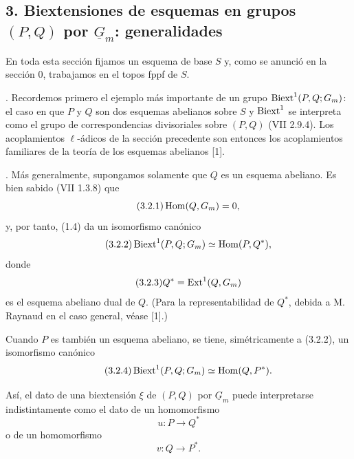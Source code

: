 
\subsection*{3. Biextensiones de esquemas en grupos $(P,Q)$ por
$\underline G_m$: generalidades}

En toda esta sección fijamos un esquema de base $S$ y, como se anunció
en la sección 0, trabajamos en el topos fppf de $S$.

\medskip
{}. Recordemos primero el ejemplo más importante de un
grupo $\operatorname{Biext}^1(P,Q;G_m)$: el caso en que $P$ y $Q$ son
dos esquemas abelianos sobre $S$ y $\operatorname{Biext}^1$ se interpreta como el
grupo de correspondencias divisoriales sobre $(P,Q)$ (VII 2.9.4). Los
acoplamientos $\ell$-ádicos de la sección precedente son entonces los
acoplamientos familiares de la teoría de los esquemas abelianos [1].

\medskip
{}. Más generalmente, supongamos solamente que $Q$ es un
esquema abeliano. Es bien sabido (VII 1.3.8) que
\begin{equation}\tag{3.2.1}
 \operatorname{Hom}(Q,G_m)=0,
\end{equation}
y, por tanto, (1.4) da un isomorfismo canónico
\begin{equation}\tag{3.2.2}
 \operatorname{Biext}^1(P,Q;G_m)\simeq\operatorname{Hom}(P,Q^*),
\end{equation}
donde
\begin{equation}\tag{3.2.3}
 Q^*=\operatorname{Ext}^1(Q,G_m)
\end{equation}
es el esquema abeliano dual de $Q$. (Para la representabilidad de
$Q^*$, debida a M. Raynaud en el caso general, véase [1].)

Cuando $P$ es también un esquema abeliano, se tiene, simétricamente a
(3.2.2), un isomorfismo canónico
\begin{equation}\tag{3.2.4}
 \operatorname{Biext}^1(P,Q;G_m)\simeq\operatorname{Hom}(Q,P^*).
\end{equation}


Así, el dato de una biextensión $\xi$ de $(P,Q)$ por $\underline G_m$
puede interpretarse indistintamente como el dato de un homomorfismo
\[
 u:P\longrightarrow Q^*
\]
o de un homomorfismo
\[
 v:Q\longrightarrow P^*.
\]

